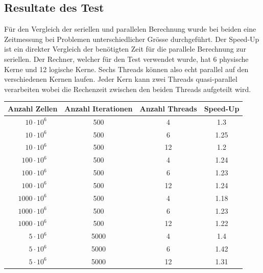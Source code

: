 \subsection{Resultate des Test
\label{parallelisierung:sub:Test}}

Für den Vergleich der seriellen und parallelen Berechnung wurde bei beiden eine Zeitmessung bei Problemen unterschiedlicher Grösse durchgeführt.
Der Speed-Up ist ein direkter Vergleich der benötigten Zeit für die parallele Berechnung zur seriellen.
Der Rechner, welcher für den Test verwendet wurde, hat 6 physische Kerne und 12 logische Kerne. 
Sechs Threads können also echt parallel auf den verschiedenen Kernen laufen.
Jeder Kern kann zwei Threads quasi-parallel verarbeiten wobei die Rechenzeit zwischen den beiden Threads aufgeteilt wird.


\begin{table}
	\centering
	\begin{tabular}{c c c c}
		Anzahl Zellen & Anzahl Iterationen & Anzahl Threads & Speed-Up \\
		\hline
		$\phantom{00}10 \cdot 10^6$ & \phantom{00}500 & \phantom{0}4 & 1.3\phantom{0}\\
		$\phantom{00}10 \cdot 10^6$ & \phantom{00}500 & \phantom{0}6 & 1.25\\
		$\phantom{00}10 \cdot 10^6$ & \phantom{00}500 & 12           & 1.2\phantom{0}\\
		
		$\phantom{0}100 \cdot 10^6$ & \phantom{00}500 & \phantom{0}4 & 1.24\\
		$\phantom{0}100 \cdot 10^6$ & \phantom{00}500 & \phantom{0}6 & 1.23\\
		$\phantom{0}100 \cdot 10^6$ & \phantom{00}500 & 12           & 1.24\\
		
		$1000 \cdot 10^6$           & \phantom{00}500 & \phantom{0}4 & 1.18\\
		$1000 \cdot 10^6$           & \phantom{00}500 & \phantom{0}6 & 1.23\\
		$1000 \cdot 10^6$           & \phantom{00}500 & 12           & 1.22\\
		
		
		$\phantom{000}5 \cdot 10^6$ & \phantom{0}5000 & \phantom{0}4  & 1.4\phantom{0}\\
		$\phantom{000}5 \cdot 10^6$ & \phantom{0}5000 & \phantom{0}6  & 1.42 \\
		$\phantom{000}5 \cdot 10^6$ & \phantom{0}5000 & 12            & 1.31\\
		

\end{tabular}
\end{table}
